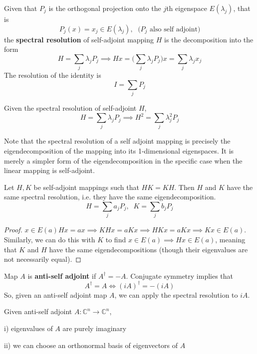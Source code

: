   \begin{definition}
  Given that $P_j$ is the orthogonal projection onto the $j$th eigenspace $E(\lambda_j)$, that is
  \[P_j (x) = x_j \in E(\lambda_j), \; \text{ ($P_j$ also self adjoint)}\]
  the \textbf{spectral resolution} of self-adjoint mapping $H$ is the decomposition into the form 
  \[H = \sum_j \lambda_j P_j \implies H x = \bigg( \sum_j \lambda_j P_j \bigg) x = \sum_j \lambda_j x_j\]
  The resolution of the identity is
  \[I = \sum_j P_j\]
  \end{definition}

  \begin{proposition}
  Given the spectral resolution of self-adjoint $H$, 
  \[H  = \sum_j \lambda_j P_j \implies H^2 = \sum_j \lambda_j^2 P_j\]
  \end{proposition}

  Note that the spectral resolution of a self adjoint mapping is precisely the eigendecomposition of the mapping into its 1-dimensional eigenspaces. It is merely a simpler form of the eigendecomposition in the specific case when the linear mapping is self-adjoint. 

  \begin{theorem}
  Let $H, K$ be self-adjoint mappings such that $H K = K H$. Then $H$ and $K$ have the same spectral resolution, i.e. they have the same eigendecomposition. 
  \[H = \sum_j a_j P_j, \; \; K = \sum_j b_j P_j\]
  \end{theorem}
  \begin{proof}
  $ x \in E(a) H x = a x \implies K H x = a K x \implies H K x = a K x \implies K x \in E(a)$. Similarly, we can do this with $K$ to find $x \in E(a) \implies H x \in E(a)$, meaning that $K$ and $H$ have the same eigendecompositions (though their eigenvalues are not necessarily equal). 
  \end{proof}

  \begin{definition}
  Map $A$ is \textbf{anti-self adjoint }if $A^\dagger = - A$. Conjugate symmetry implies that
  \[ A^\dagger = A \iff (i A)^\dagger = - (i A)\]
  So, given an anti-self adjoint map $A$, we can apply the spectral resolution to $iA$. 
  \end{definition}

  \begin{theorem}
  Given anti-self adjoint $A: \mathbb{C}^n \longrightarrow \mathbb{C}^n$, 

  i) eigenvalues of $A$ are purely imaginary

  ii) we can choose an orthonormal basis of eigenvectors of $A$
  \end{theorem}

